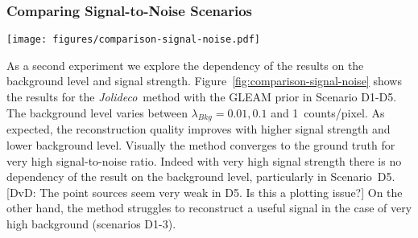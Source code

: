 \documentclass[twocolumn]{aastex631}
\newcommand{\jolideco}{\textit{Jolideco}~}
\newcommand{\dvd}[1]{{\color{red} [DvD: #1]}}
\begin{document}
    \subsubsection{Comparing Signal-to-Noise Scenarios}
    \begin{figure*}
        \begin{centering}
            \texttt{[image: figures/comparison-signal-noise.pdf]}
            \caption{
                Comparison of \jolideco with the GLEAM v0.1 prior for different background levels and signal strength, as represented by scenario D1-D5. The images are grouped by background level with each pair of columns showing the counts data in the left column and the reconstruction in the right column. The rows show the scenarios D1-D5 as described in Section~\ref{subsec:test-datasets}. Each pair of columns corresponds to a  background level,  \qty[mode = text]{0.001}{cts / pixel}, \qty[mode = text]{0.01}{cts / pixel} and \qty[mode = text]{0.1}{cts / pixel}. The complete results for the simulations and additional information are available at \url{https://jolideco.github.io/jolideco-comparison}.
            }
            \label{fig:comparison-signal-noise}
        \end{centering}
    \end{figure*}
    As a second experiment we explore the dependency of the results on the background level and signal strength. Figure~\ref{fig:comparison-signal-noise} shows the results for the \jolideco method with the GLEAM prior in Scenario D1-D5. The background level varies between $\lambda_{Bkg}= 0.01, 0.1$ and \qty[mode = text]{1}{counts/pixel}. As expected, the reconstruction quality improves with higher signal strength and lower background level. Visually the method converges to the ground truth for very high signal-to-noise ratio. Indeed with very high signal strength there is no dependency of the result on the background level, particularly in Scenario~D5. \dvd{The point sources seem very weak in D5. Is this a plotting issue?} On the other hand, the method struggles to reconstruct a useful signal in the case of very high background (scenarios D1-3). 
\end{document}
